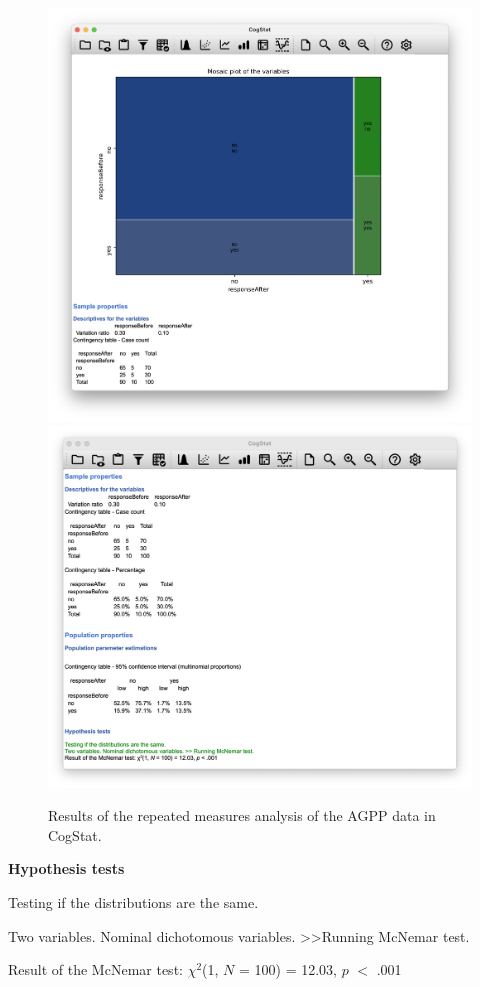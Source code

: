 \documentclass[
]{book}
\theoremstyle{definition}
\theoremstyle{definition}
\theoremstyle{definition}
\theoremstyle{definition}
\theoremstyle{remark}
\begin{document}
\begin{figure}

{\centering \includegraphics[width=0.66\linewidth]{resources/image/cogstatagppresults1} \includegraphics[width=0.66\linewidth]{resources/image/cogstatagppresults2} 

}

\caption{Results of the repeated measures analysis of the AGPP data in CogStat.}\label{fig:cogstatagppresults}
\end{figure}

\begin{tcolorbox}[colback=white,
  colframe=lightgray,
  coltext=black,
  boxsep=4pt,
  boxrule=0.3pt,
  arc=0pt]
  {   \sffamily
      \color{CSblue}\textbf{Hypothesis tests}
      
      \color{CSgreen}Testing if the distributions are the same.
      
      Two variables. Nominal dichotomous variables. \textgreater\textgreater  Running McNemar test.
      
      \color{black}
      Result of the McNemar test: $\chi^2$(1, $N$ = 100) = 12.03, $p$ $<$ .001
      \normalfont
  }
\end{tcolorbox}
\end{document}
